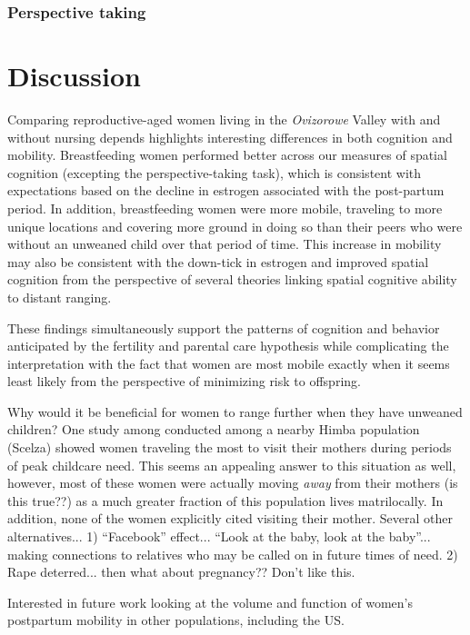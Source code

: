 		\subsubsection{Perspective taking}
		\label{sec:3.2.4}

\section{Discussion}
\label{sec:4}
Comparing reproductive-aged women living in the \emph{Ovizorowe} Valley with and without nursing depends highlights interesting differences in both cognition and mobility.  Breastfeeding women performed better across our measures of spatial cognition (excepting the perspective-taking task), which is consistent with expectations based on the decline in estrogen associated with the post-partum period.  In addition, breastfeeding women were more mobile, traveling to more unique locations and covering more ground in doing so than their peers who were without an unweaned child over that period of time.  This increase in mobility may also be consistent with the down-tick in estrogen and improved spatial cognition from the perspective of several theories linking spatial cognitive ability to distant ranging.  

These findings simultaneously support the patterns of cognition and behavior anticipated by the fertility and parental care hypothesis while complicating the interpretation with the fact that women are most mobile exactly when it seems least likely from the perspective of minimizing risk to offspring.

Why would it be beneficial for women to range further when they have unweaned children?  One study among conducted among a nearby  Himba population (Scelza) showed women traveling the most to visit their mothers during periods of peak childcare need.  This seems an appealing answer to this situation as well, however, most of these women were actually moving \emph{away} from their mothers (is this true??) as a much greater fraction of this population lives matrilocally.  In addition, none of the women explicitly cited visiting their mother.  Several other alternatives... 1) ``Facebook'' effect...  ``Look at the baby, look at the baby''... making connections to relatives who may be called on in future times of need.  2) Rape deterred... then what about pregnancy??  Don't like this.

Interested in future work looking at the volume and function of women's postpartum mobility in other populations, including the US.


